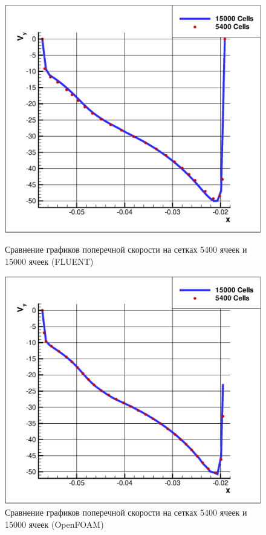 \begin{figure}[ht]
	\begin{minipage}{0.475\linewidth}
		\includegraphics[scale=0.33]{uDuctMeshIndependence1}
		\caption{Сравнение графиков поперечной скорости на сетках 5400 ячеек и 15000 ячеек (FLUENT)}
		\label{fig:uDuctMeshIndependence1}
	\end{minipage}
	\hspace{0.5em}
	\begin{minipage}{0.475\linewidth}
		\includegraphics[scale=0.33]{uDuctMeshIndependence2}
		\caption{Сравнение графиков поперечной скорости на сетках 5400 ячеек и 15000 ячеек (OpenFOAM)}
		\label{fig:uDuctMeshIndependence2}
	\end{minipage}
\end{figure}
